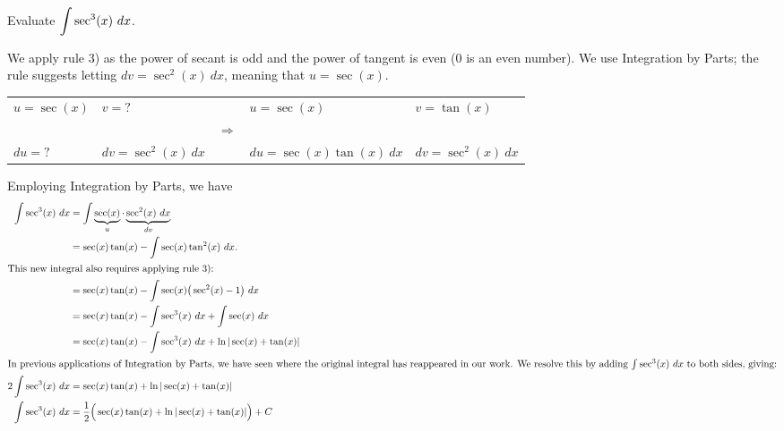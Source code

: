 \begin{example} \label{eg:5.2.4} %
Evaluate $\displaystyle\int \sec^3(x)\ dx$.

\solution We apply rule $3$) as the power of secant is odd and the power of tangent is even ($0$ is an even number). We use Integration by Parts; the rule suggests letting $dv = \sec^2(x)\ dx$, meaning that $u = \sec(x)$. \\ \footnotesize

\begin{tabular}{llcll}  
$u= \sec(x)$ & $v=\text{?}$ &  & $u= \sec(x)$ & $v=\tan(x)$ \\
 && $\Rightarrow$ && \\
$du= \text{?}$ & $dv=\sec^2(x)\ dx$ & & $du= \sec(x)\tan(x)\ dx$ & $dv=\sec^2(x)\ dx$ \\
\end{tabular}\small

\vspace{.25cm}

Employing Integration by Parts, we have
\begin{align*}
\int \sec^3(x)\ dx  	&=	\int \underbrace{\sec(x)}_u\cdot\underbrace{\sec^2(x)\ dx}_{dv}\\
						&=	\sec(x)\tan(x) - \int \sec(x) \tan^2(x)\ dx. \\
\intertext{This new integral also requires applying rule $3$):}
						&= \sec(x)\tan(x) - \int \sec(x) \big(\sec^2(x)-1\big)\ dx\\
						&=	\sec(x)\tan(x) - \int \sec^3(x)\ dx + \int \sec(x)\ dx \\
						&= \sec(x)\tan(x) -\int \sec^3(x)\ dx + \ln|\sec(x)+\tan(x)| \\
\intertext{In previous applications of Integration by Parts, we have seen where the original integral has reappeared in our work. We resolve this by adding $\int \sec^3(x)\ dx$ to both sides, giving:}
2\int \sec^3(x)\ dx &= \sec(x)\tan(x) + \ln|\sec(x)+\tan(x)| \\
\int \sec^3(x)\ dx &= \frac12\Big(\sec(x)\tan(x) + \ln|\sec(x)+\tan(x)|\Big)+C
\end{align*}	
\end{example}